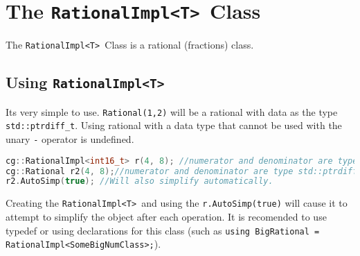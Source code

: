 \documentclass{article}
\newlength\tdima \newlength\tdimb \setlength\tdima{ \fboxsep+\fboxrule} \setlength\tdimb{-\fboxsep+\fboxrule}
\newcommand{\theobj}{\protect\Verb+RationalImpl<T> +}
\begin{document}
\tableofcontents




\captionsetup[lstlisting]{format=listing,labelfont=white,textfont=white}
\lstset{style=cppstyle}

\section{The \theobj Class}

The \theobj Class is a rational (fractions) class. 

\subsection{Using \theobj}

Its very simple to use.  \Verb+Rational(1,2)+ will be a rational with data as the type \Verb+std::ptrdiff_t+. Using rational with a data type that cannot be used with the unary \Verb+-+ operator is undefined.

\begin{lstlisting}[language=C++, label=code:1, caption=Creating organized rationals with \theobj]
cg::RationalImpl<int16_t> r(4, 8); //numerator and denominator are type int16_t.
cg::Rational r2(4, 8);//numerator and denominator are type std::ptrdiff_t.  
r2.AutoSimp(true); //Will also simplify automatically.
\end{lstlisting}

Creating the \theobj and using the \Verb+r.AutoSimp(true)+ will cause it to attempt to simplify the object after each operation.  It is recomended to use typedef or using declarations for this class (such as \Verb+using BigRational = RationalImpl<SomeBigNumClass>;+).
\end{document}
